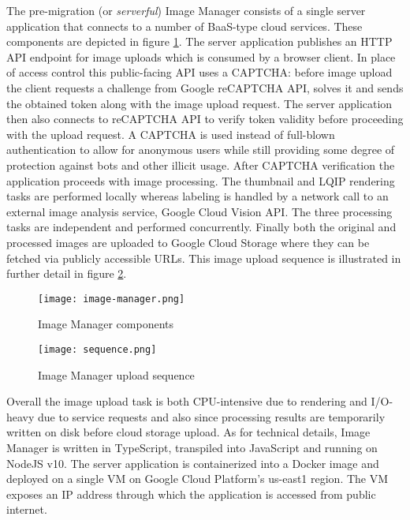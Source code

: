 The pre-migration (or \textit{serverful}) Image Manager consists of a single server application that connects to a number of BaaS-type cloud services. These components are depicted in figure \ref{fig:serverfulArchitecture}. The server application publishes an HTTP API endpoint for image uploads which is consumed by a browser client. In place of access control this public-facing API uses a CAPTCHA: before image upload the client requests a challenge from Google reCAPTCHA API, solves it and sends the obtained token along with the image upload request. The server application then also connects to reCAPTCHA API to verify token validity before proceeding with the upload request. A CAPTCHA is used instead of full-blown authentication to allow for anonymous users while still providing some degree of protection against bots and other illicit usage. After CAPTCHA verification the application proceeds with image processing. The thumbnail and LQIP rendering tasks are performed locally whereas labeling is handled by a network call to an external image analysis service, Google Cloud Vision API. The three processing tasks are independent and performed concurrently. Finally both the original and processed images are uploaded to Google Cloud Storage where they can be fetched via publicly accessible URLs. This image upload sequence is illustrated in further detail in figure \ref{fig:serverfulSequence}.

\begin{figure}[H]
  \centering
  \texttt{[image: image-manager.png]}
  \caption{Image Manager components}
  \label{fig:serverfulArchitecture}
\end{figure}

\begin{figure}[H]
  \centering
  \texttt{[image: sequence.png]}
  \caption{Image Manager upload sequence}
  \label{fig:serverfulSequence}
\end{figure}

Overall the image upload task is both CPU-intensive due to rendering and I/O-heavy due to service requests and also since processing results are temporarily written on disk before cloud storage upload. As for technical details, Image Manager is written in TypeScript, transpiled into JavaScript and running on NodeJS v10. The server application is containerized into a Docker image and deployed on a single VM on Google Cloud Platform's us-east1 region. The VM exposes an IP address through which the application is accessed from public internet.

